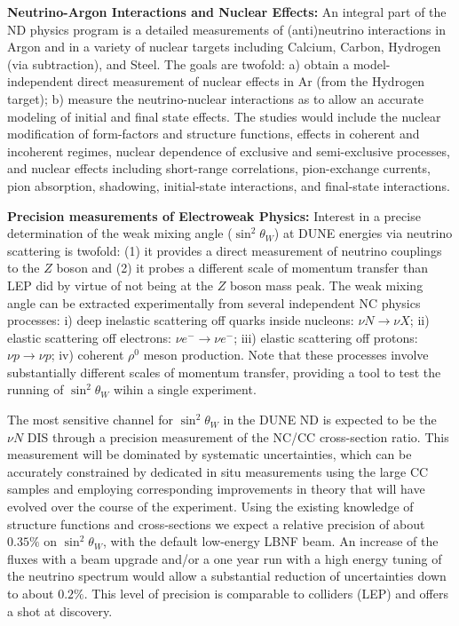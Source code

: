 \vspace{0.25cm} 
\noindent 
{\bf Neutrino-Argon Interactions and Nuclear Effects:} 
An integral part of the ND physics program is a  detailed measurements of (anti)neutrino 
interactions in Argon and in a variety of nuclear targets including Calcium, Carbon, Hydrogen (via subtraction), 
and Steel. 
The goals are twofold: a) obtain a model-independent direct measurement of nuclear effects in Ar (from 
the Hydrogen target); b) measure the neutrino-nuclear interactions as to allow an accurate modeling 
of initial and final state effects. The studies would include 
the nuclear modification of form-factors and structure functions, effects in coherent and incoherent 
regimes, nuclear dependence of exclusive and semi-exclusive processes, and nuclear 
effects including short-range correlations, pion-exchange currents, pion absorption, shadowing, 
initial-state interactions, and final-state interactions. 

\vspace{0.25cm} 
\noindent 
{\bf Precision measurements of  Electroweak Physics:} 
Interest in a precise determination of the weak mixing angle ($\sin^2 \theta_W$) at DUNE 
energies via neutrino scattering is twofold: (1) it provides a direct measurement of neutrino couplings to 
the $Z$ boson and (2) it probes a different scale of momentum transfer than LEP did by virtue
of not being at the $Z$ boson mass peak. 
% 
The weak mixing angle can be extracted experimentally from several independent NC physics processes:
i) deep inelastic scattering off quarks inside nucleons: $\nu N \to \nu X$; ii) elastic scattering off electrons: $\nu e^- \to \nu e^-$; 
iii) elastic scattering off protons: $\nu p \to \nu p$; iv) coherent $\rho^0$ meson production. 
Note that these processes involve
substantially different scales of momentum transfer, providing a tool
to test the running of $\sin^2 \theta_W$ wihin a single experiment. 

The most sensitive channel for $\sin^2 \theta_W$ 
in the DUNE ND is expected to be the $\nu N$ DIS through a precision measurement 
of the NC/CC cross-section ratio. This measurement will be dominated by systematic uncertainties, which can be 
accurately constrained by dedicated in situ measurements using the large CC samples and employing corresponding 
improvements in theory that will have evolved over the course of the experiment. Using the existing knowledge of 
structure functions and cross-sections we expect a relative precision of about $0.35\%$ on $\sin^2 \theta_W$, with 
the default low-energy LBNF beam. An increase of the fluxes with a beam upgrade and/or a one year run with a high 
energy tuning of the neutrino spectrum would allow a substantial reduction of uncertainties down to about $0.2\%$. 
This level of precision is comparable to colliders (LEP) and offers a shot at discovery. 

